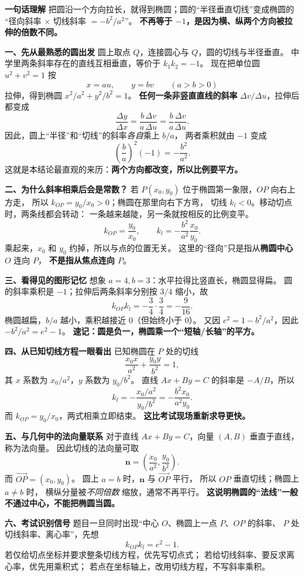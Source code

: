 \begin{explanationbox}
\textbf{\textcolor{CExplanation}{一句话理解}}
把圆沿一个方向拉长，就得到椭圆；圆的“半径垂直切线”变成椭圆的
“径向斜率 $\times$ 切线斜率 $=-b^2/a^2$”。
\textbf{不再等于 $-1$，是因为横、纵两个方向被拉伸的倍数不同。}

\medskip
\textbf{\textcolor{CExplanation}{一、先从最熟悉的圆出发}}
圆上取点 $Q$，连接圆心与 $Q$，圆的切线与半径垂直。
中学里两条斜率存在的直线互相垂直，等价于 $k_1k_2=-1$。
现在把单位圆 $u^2+v^2=1$ 按
\[
        x=au,\qquad y=bv\qquad(a>b>0)
\]
拉伸，得到椭圆 $x^2/a^2+y^2/b^2=1$。
\textbf{任何一条非竖直直线的斜率} $\Delta v/\Delta u$，拉伸后都变成
\[
  \frac{\Delta y}{\Delta x}
  =\frac{b\,\Delta v}{a\,\Delta u}
  =\frac ba\frac{\Delta v}{\Delta u}.
\]
因此，圆上“半径”和“切线”的斜率\emph{各自}乘上 $b/a$，
两者乘积就由 $-1$ 变成
\[
   \left(\frac ba\right)^2(-1)=-\frac{b^2}{a^2}.
\]
这就是本结论最直观的来历：\textbf{两个方向都改变，所以比例要平方。}

\medskip
\textbf{\textcolor{CExplanation}{二、为什么斜率相乘后会是常数？}}
若 $P(x_0,y_0)$ 位于椭圆第一象限，$OP$ 向右上方走，
所以 $k_{OP}=y_0/x_0>0$；椭圆在那里向右下方弯，
切线 $k_l<0$。移动切点时，两条线都会转动：
一条越来越陡，另一条就按相反的比例变平。
\[
 k_{OP}=\frac{y_0}{x_0},\qquad
 k_l=-\frac{b^2}{a^2}\frac{x_0}{y_0}.
\]
乘起来，$x_0$ 和 $y_0$ 约掉，所以与点的位置无关。
这里的“径向”只是指从\textbf{椭圆中心 $O$} 连向 $P$，
\textbf{不是指从焦点连向 $P$}。

\medskip
\textbf{\textcolor{CExplanation}{三、看得见的图形记忆}}
想象 $a=4,b=3$：水平拉得比竖直长，椭圆显得扁。
圆的斜率乘积是 $-1$；拉伸后两条斜率分别按 $3/4$ 缩小，故
\[
 k_{OP}k_l=-\frac34\cdot\frac34=-\frac9{16}.
\]
椭圆越扁，$b/a$ 越小，乘积越接近 $0$（但始终小于 $0$）。
又因 $e^2=1-b^2/a^2$，因此 $-b^2/a^2=e^2-1$。
\textbf{速记：圆是负一，椭圆乘一个“短轴/长轴”的平方。}

\medskip
\textbf{\textcolor{CExplanation}{四、从已知切线方程一眼看出}}
已知椭圆在 $P$ 处的切线
\[
  \frac{x_0x}{a^2}+\frac{y_0y}{b^2}=1,
\]
其 $x$ 系数为 $x_0/a^2$，$y$ 系数为 $y_0/b^2$。
直线 $Ax+By=C$ 的斜率是 $-A/B$，所以
\[
    k_l=-\frac{x_0/a^2}{y_0/b^2}
       =-\frac{b^2x_0}{a^2y_0}.
\]
而 $k_{OP}=y_0/x_0$，两式相乘立即结束。
\textbf{这比考试现场重新求导更快。}

\medskip
\textbf{\textcolor{CExplanation}{五、与几何中的法向量联系}}
对于直线 $Ax+By=C$，向量 $(A,B)$ 垂直于直线，称为法向量。
因此切线的法向量可取
\[
 \boldsymbol n=\left(\frac{x_0}{a^2},\frac{y_0}{b^2}\right).
\]
而 $\overrightarrow{OP}=(x_0,y_0)$。
圆上 $a=b$ 时，$\boldsymbol n$ 与 $\overrightarrow{OP}$ 平行，
所以 $OP$ 垂直切线；椭圆上 $a\ne b$ 时，
横纵分量被\emph{不同倍数} 缩放，通常不再平行。
\textbf{这说明椭圆的“法线”一般不通过中心，不能把椭圆当圆。}

\medskip
\textbf{\textcolor{CExplanation}{六、考试识别信号}}
题目一旦同时出现“中心 $O$、椭圆上一点 $P$、$OP$ 的斜率、
$P$ 处切线斜率、离心率”，先想
\[
 \boxed{k_{OP}k_l=e^2-1.}
\]
若仅给切点坐标并要求整条切线方程，优先写切点式；
若给切线斜率、要反求离心率，优先用乘积式；
若点在坐标轴上，改用切线方程，不写斜率乘积。
\end{explanationbox}
